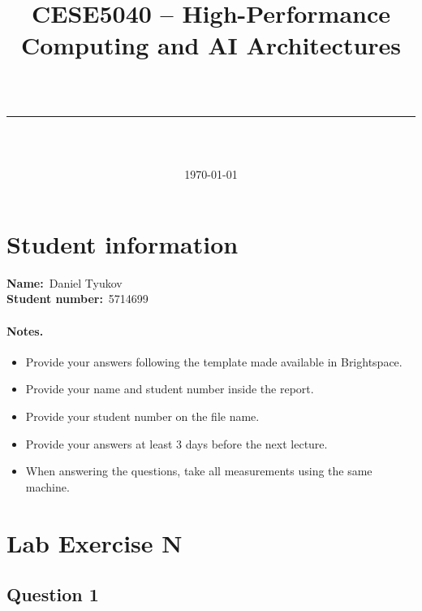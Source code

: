 \documentclass[11pt, a4paper]{article}
\title{%
    \vspace{-2em}
    \large CESE5040 -- High-Performance Computing and AI Architectures \\[0.4em]
    \Large \textbf{\labtitle} \\[0.6em]
    \rule{\linewidth}{0.4pt}
}
\author{\studentname{} \\ \texttt{\studentnumber}}
\date{\today}
\renewcommand{\studentname}{Daniel Tyukov}
\renewcommand{\studentnumber}{5714699}
\begin{document}
\maketitle
\thispagestyle{fancy}

\section{Student information}

\noindent\textbf{Name:}~\studentname{}\\
\textbf{Student number:}~\studentnumber{}

\paragraph{Notes.}
\begin{itemize}
    \itemsep0em
    \item Provide your answers following the template made available in Brightspace.
    \item Provide your name and student number inside the report.
    \item Provide your student number on the file name.
    \item Provide your answers at least 3 days before the next lecture.
    \item When answering the questions, take all measurements using the same machine.
\end{itemize}

\section{Lab Exercise N}


\subsection{Question 1}
\answerhere{}
\end{document}
